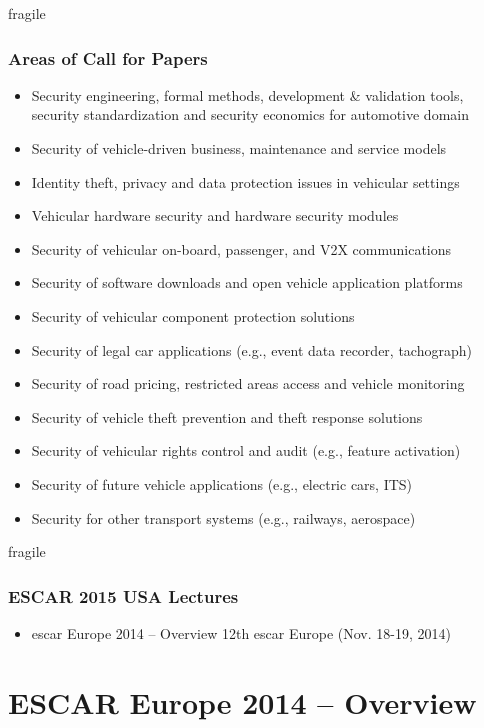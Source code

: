 \documentclass[10pt,aspectratio=169]{beamer}
\begin{document}
\begin{frame}{fragile}
  \frametitle{Areas of Call for Papers}

  {\small
  \begin{itemize}
      \item Security engineering, formal methods, development \& validation tools, 
          security standardization and security economics for automotive domain
      \item Security of vehicle-driven business, maintenance and service models
      \item Identity theft, privacy and data protection issues in vehicular settings
      \item Vehicular hardware security and hardware security modules
      \item Security of vehicular on-board, passenger, and V2X communications
      \item Security of software downloads and open vehicle application platforms
      \item Security of vehicular component protection solutions
      \item Security of legal car applications (e.g., event data recorder, tachograph)
      \item Security of road pricing, restricted areas access and vehicle monitoring
      \item Security of vehicle theft prevention and theft response solutions
      \item Security of vehicular rights control and audit (e.g., feature activation)
      \item Security of future vehicle applications (e.g., electric cars, ITS)
      \item Security for other transport systems (e.g., railways, aerospace)
  \end{itemize}
  }
\end{frame}

\begin{frame}{fragile}
  \frametitle{ESCAR 2015 USA Lectures}

  \begin{itemize}
      \item escar Europe 2014 -- Overview 12th escar Europe (Nov. 18-19, 2014)
  \end{itemize}
\end{frame}

\section{ESCAR Europe 2014 -- Overview}
\end{document}
